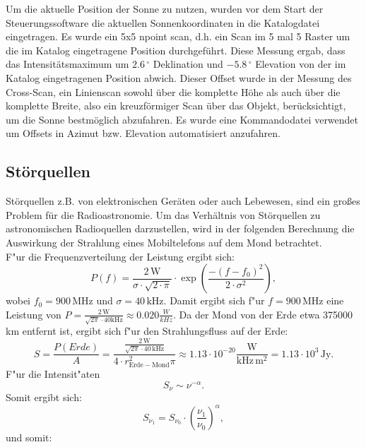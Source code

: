 Um die aktuelle Position der Sonne zu nutzen, wurden vor dem Start der Steuerungssoftware die aktuellen Sonnenkoordinaten in die Katalogdatei eingetragen.
Es wurde ein 5x5 npoint scan, d.h. ein Scan im 5 mal 5 Raster um die im Katalog eingetragene Position durchgeführt. Diese Messung ergab, dass das Intensitätsmaximum um $2.6\,^\circ$ Deklination und $-5.8\,^\circ$ Elevation von der im Katalog eingetragenen Position abwich. Dieser Offset wurde in der Messung des Cross-Scan, ein Linienscan sowohl über die komplette Höhe als auch über die komplette Breite, also ein kreuzförmiger Scan über das Objekt, berücksichtigt, um die Sonne bestmöglich abzufahren.
Es wurde eine Kommandodatei verwendet um Offsets in Azimut bzw. Elevation automatisiert anzufahren.
\subsection{Störquellen}
Störquellen z.B. von elektronischen Geräten oder auch Lebewesen, sind ein großes Problem für die Radioastronomie.
Um das Verhältnis von Störquellen zu astronomischen Radioquellen darzustellen, wird in der folgenden Berechnung die Auswirkung der Strahlung eines Mobiltelefons auf dem Mond betrachtet.\\

F"ur die Frequenzverteilung der Leistung ergibt sich:
\begin{equation}
P(f) = \frac{2 \, \mathrm{W}}{\sigma \cdot \sqrt{2 \cdot \pi}} \cdot \exp\left({\frac{-(f-f_0)^2}{2 \cdot \sigma^2}}\right), 
\end{equation}
wobei $f_0 = 900\,  \mathrm{MHz}$ und $\sigma = 40\,  \mathrm{kHz}$. Damit ergibt sich f"ur $ f = 900\,  \mathrm{MHz} $ eine Leistung von $ P = \frac{2\,  \mathrm{W}}{\sqrt{2 \pi} \cdot 40 \mathrm{kHz}} \approx 0.020 \frac{W}{kHz}$. 
Da der Mond von der Erde etwa 375000 km entfernt ist, ergibt sich f"ur den Strahlungsfluss auf der Erde: 
\begin{equation}
S = \frac{P(Erde)}{A} = \frac{\frac{2\,  \mathrm{W}}{\sqrt{2 \pi} \cdot 40\,  \mathrm{kHz}}}{4 \cdot r_{\mathrm{Erde-Mond}}^2 \pi} \approx 1.13 \cdot 10^{-20} \frac{\mathrm{W}}{\mathrm{kHz}\,  \mathrm{m}^2} = 1.13 \cdot 10^3 \, \mathrm{Jy}. 
\end{equation}
F"ur die Intensit"aten 
\begin{equation}
S_{\nu} \sim \nu^{-\alpha}. 
\end{equation}
Somit ergibt sich: 
\begin{equation}
S_{\nu_1} = S_{\nu_0} \cdot (\frac{\nu_1}{\nu_0})^\alpha, 
\end{equation}
und somit:

